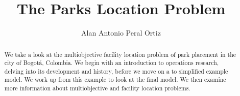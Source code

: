 \documentclass[12pt]{pom_thesis}
\author{Alan Antonio Peral Ortiz}
\title{The Parks Location Problem}
\theoremstyle{definition}
\begin{document}
\maketitle

\begin{abstract}We take a look at the multiobjective facility location problem of park placement in the city of Bogot\'{a}, Colombia. We begin with an introduction to operations research, delving into its development and history, before we move on a to simplified example model. We work up from this example to look at the final model. We then examine more information about multiobjective and facility location problems.
\end{abstract}

\tableofcontents

\newpage
{}
\end{document}
